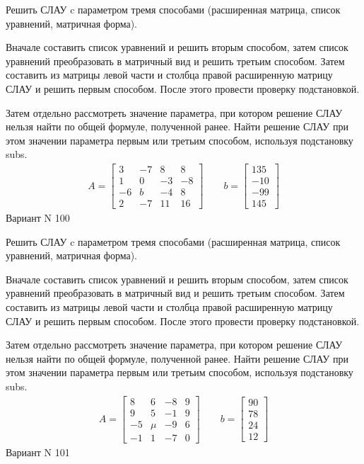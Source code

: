 \documentclass[11pt]{report}
\begin{document}
Решить СЛАУ c параметром тремя способами (расширенная матрица, список уравнений, матричная форма).

Вначале составить список уравнений и решить вторым способом,
затем список уравнений преобразовать в матричный вид и решить третьим способом.
Затем составить из матрицы левой части и столбца правой расширенную матрицу СЛАУ и решить первым способом.
После этого провести проверку подстановкой.

Затем отдельно рассмотреть значение параметра, при котором решение СЛАУ нельзя найти по общей формуле,
полученной ранее.
Найти решение СЛАУ при этом значении параметра первым или третьим способом, используя подстановку subs.
\begin{align*}
    A = \left[\begin{matrix}3 & -7 & 8 & 8\\1 & 0 & -3 & -8\\-6 & b & -4 & 8\\2 & -7 & 11 & 16\end{matrix}\right]
\qquad b = \left[\begin{matrix}135\\-10\\-99\\145\end{matrix}\right]
\end{align*}
\newpage
Вариант N 100


Решить СЛАУ c параметром тремя способами (расширенная матрица, список уравнений, матричная форма).

Вначале составить список уравнений и решить вторым способом,
затем список уравнений преобразовать в матричный вид и решить третьим способом.
Затем составить из матрицы левой части и столбца правой расширенную матрицу СЛАУ и решить первым способом.
После этого провести проверку подстановкой.

Затем отдельно рассмотреть значение параметра, при котором решение СЛАУ нельзя найти по общей формуле,
полученной ранее.
Найти решение СЛАУ при этом значении параметра первым или третьим способом, используя подстановку subs.
\begin{align*}
    A = \left[\begin{matrix}8 & 6 & -8 & 9\\9 & 5 & -1 & 9\\-5 & \mu & -9 & 6\\-1 & 1 & -7 & 0\end{matrix}\right]
\qquad b = \left[\begin{matrix}90\\78\\24\\12\end{matrix}\right]
\end{align*}
\newpage
Вариант N 101
\end{document}
